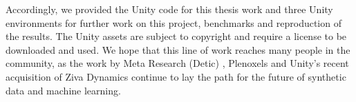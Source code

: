 Accordingly, we provided the Unity code for this thesis work and three Unity environments for further work on this project, benchmarks and reproduction of the results. The Unity assets are subject to copyright and require a license to be downloaded and used. We hope that this line of work reaches many people in the community, as the work by Meta Research (Detic) \cite{detic2022}, Plenoxels \cite{yu2021plenoxels} and Unity's recent acquisition of Ziva Dynamics \cite{unityziva2022dynamics} continue to lay the path for the future of synthetic data and machine learning.




    
